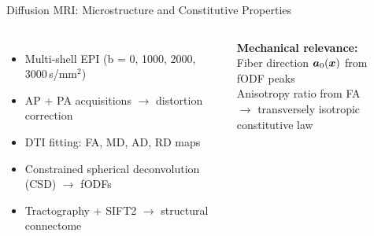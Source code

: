 \begin{frame}{Diffusion MRI: Microstructure and Constitutive Properties}

  \begin{columns}[T]
    \begin{itemize}
      \item Multi-shell EPI (b = 0, 1000, 2000, 3000\,s/mm$^2$)
      \item AP + PA acquisitions $\to$ distortion correction
      \item DTI fitting: FA, MD, AD, RD maps
      \item Constrained spherical deconvolution (CSD) $\to$ fODFs
      \item Tractography + SIFT2 $\to$ structural connectome
    \end{itemize}

    \bigskip

    \textbf{Mechanical relevance:}\\
    Fiber direction $\bm{a}_0(\bm{x})$ from fODF peaks\\
    Anisotropy ratio from FA\\
    $\to$ transversely isotropic constitutive law

    \begin{center}
    \end{center}
  \end{columns}

\end{frame}

